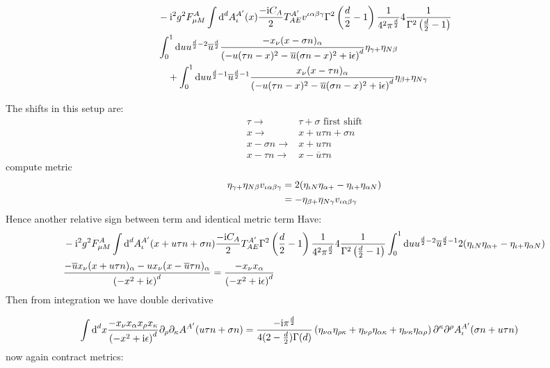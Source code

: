 \begin{align}
	&-\text{i}^2 g^2 F_{\mu M}^{A} \int \text{d} ^d  A_\iota^{A'}(x)\frac{-\text{i} C_A}{2} T^{A'}_{AE}v^{\iota \alpha\beta\gamma}\Gamma^2\left(\frac{d}{2}-1\right)\frac{1}{4^2\pi^\frac{d}{2}}4 \frac{1}{\Gamma^2\left(\frac{d}{2}-1\right)}
	\\
	&\int_0^1 \text{d} u u^{\frac{d}{2}-2}\overline u^{\frac{d}{2}}\frac{-x_\nu(x-\sigma n)_\alpha}{\left(-u(\tau n -x)^2-\overline u(\sigma n -x)^2+\text{i} \epsilon\right)^{d}}\eta_{\gamma +}\eta_{N \beta}
	\\&~~~
	+\int_0^1 \text{d} u u^{\frac{d}{2}-1}\overline u^{\frac{d}{2}-1}\frac{x_\nu(x- \tau  n )_\alpha}{\left(-u(\tau n -x)^2-\overline u(\sigma n -x)^2+\text{i} \epsilon\right)^{d}}\eta_{\beta +}\eta_{N \gamma}
\end{align}

The shifts in this setup are:
\begin{align}
	\tau \rightarrow &\tau + \sigma \text{   first shift}
	\\
	x \rightarrow & x + u\tau n + \sigma n
	\\
	x-\sigma n \rightarrow & x + u \tau n
	\\
	x-\tau n \rightarrow & x  - \overline u \tau n 
\end{align}
compute metric
\begin{align}
	\eta_{\gamma +}\eta_{N \beta}v_{\iota \alpha \beta\gamma} 
	&=
	2(\eta_{\iota N}\eta_{\alpha +} - \eta_{\iota+ }\eta_{\alpha N})
	\\
	&=
	-\eta_{\beta +}\eta_{N \gamma}v_{\iota \alpha \beta\gamma} 
\end{align}
Hence another relative sign between term and identical metric term
Have:
\begin{align}
	&-\text{i}^2 g^2 F_{\mu M}^{A} \int \text{d} ^d  A_\iota^{A'}(x+ u \tau n+ \sigma n)\frac{-\text{i} C_A}{2} T^{A'}_{AE}\Gamma^2\left(\frac{d}{2}-1\right)\frac{1}{4^2\pi^\frac{d}{2}}4 \frac{1}{\Gamma^2\left(\frac{d}{2}-1\right)}\int_0^1 \text{d} u u^{\frac{d}{2}-2}\overline u^{\frac{d}{2}-1}2(\eta_{\iota N}\eta_{\alpha +} - \eta_{\iota+ }\eta_{\alpha N})
	\\
	&\frac{-\overline u x_\nu(x+ u \tau  n)_\alpha- u x_\nu(x - \overline u \tau n )_\alpha }{\left(-x^2+\text{i} \epsilon\right)^{d}} =\frac{-x_\nu x_\alpha}{\left(-x^2+\text{i} \epsilon\right)^{d}}
\end{align}
Then from integration we have double derivative

\begin{align}
	\int \text{d} ^d x \frac{-x_\nu x_\alpha x_\rho x_\kappa}{\left(-x^2+\text{i} \epsilon\right)^{d}} \partial_\rho \partial_\kappa A^{A'}(u\tau n + \sigma n)
	&=
	\frac{-\text{i} \pi^{\frac{d}{2}}}{4(2-\frac{d}{2})\Gamma(d)}\left(  \eta_{\nu \alpha} \eta_{\rho \kappa}+ \eta_{\nu \rho} \eta_{\alpha\kappa} + \eta_{\nu \kappa} \eta_{\alpha \rho} \right) \partial^\kappa\partial^\rho A_\iota^{A'} (\sigma n+ u\tau n)
\end{align}
now again contract metrics: 

